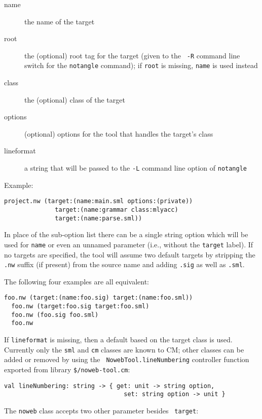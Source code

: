 \begin{description}
\item[name] the name of the target
\item[root] the (optional) root tag for the target (given to the {\tt
-R} command line switch for the {\tt notangle} command); if {\tt root}
is missing, {\tt name} is used instead
\item[class] the (optional) class of the target
\item[options] (optional) options for the tool that handles the
target's class
\item[lineformat] a string that will be passed to the {\tt -L} command
line option of {\tt notangle}
\end{description}

Example:

\begin{lstlisting}[language=CM]
  project.nw (target:(name:main.sml options:(private))
              target:(name:grammar class:mlyacc)
              target:(name:parse.sml))
\end{lstlisting}%

In place of the sub-option list there can be a single string option
which will be used for {\tt name} or even an unnamed parameter (i.e.,
without the {\tt target} label).  If no targets are specified, the
tool will assume two default targets by stripping the {\tt .nw}
suffix (if present) from the source name and adding {\tt .sig} as well
as {\tt .sml}.

The following four examples are all equivalent:

\begin{lstlisting}[language=CM]
  foo.nw (target:(name:foo.sig) target:(name:foo.sml))
  foo.nw (target:foo.sig target:foo.sml)
  foo.nw (foo.sig foo.sml)
  foo.nw
\end{lstlisting}%

If {\tt lineformat} is missing, then a default based on the target
class is used.  Currently only the {\tt sml} and {\tt cm} classes are
known to CM; other classes can be added or removed by using the {\tt
NowebTool.lineNumbering} controller function exported from library
{\tt \$/noweb-tool.cm}:

\begin{lstlisting}[language=CM]
  val lineNumbering: string -> { get: unit -> string option,
                                 set: string option -> unit }
\end{lstlisting}%

The {\tt noweb} class accepts two other parameter besides {\tt
target}:

